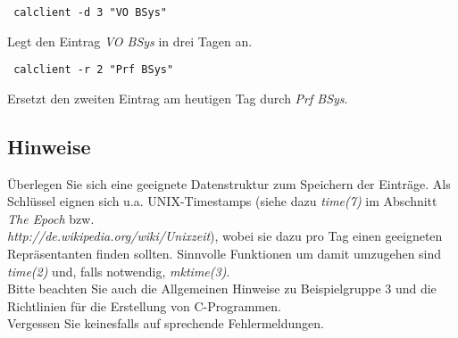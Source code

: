 \documentclass{article}
\begin{document}
\begin{verbatim} calclient -d 3 "VO BSys" 
\end{verbatim}
Legt den Eintrag \emph{VO BSys} in drei Tagen an.

\begin{verbatim} calclient -r 2 "Prf BSys" 
\end{verbatim}
Ersetzt den zweiten Eintrag am heutigen Tag durch \emph{Prf BSys}.

\subsection*{Hinweise}
Überlegen Sie sich eine geeignete Datenstruktur zum Speichern der Einträge. Als 
Schlüssel eignen sich u.a. UNIX-Timestamps (siehe dazu \emph{time(7)} im Abschnitt \emph{The Epoch}
bzw.\\ \emph{http://de.wikipedia.org/wiki/Unixzeit}), wobei sie dazu pro Tag einen geeigneten
Repräsentanten finden sollten. Sinnvolle Funktionen um damit umzugehen sind \emph{time(2)} und,
falls notwendig, \emph{mktime(3)}. \\
Bitte beachten Sie auch die Allgemeinen Hinweise zu Beispielgruppe 3 und die Richtlinien
für die Erstellung von C-Programmen.\\
Vergessen Sie keinesfalls auf sprechende Fehlermeldungen.
\end{document}
